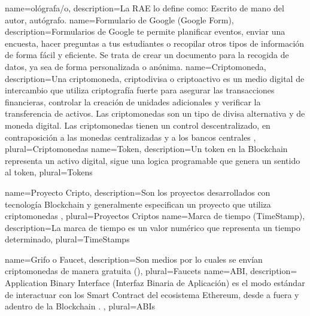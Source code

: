
{
name=ológrafa/o,
description={La RAE lo define como: Escrito de mano del autor, autógrafo. }
}
{
name=Formulario de Google  (Google Form),
description={Formularios de Google te permite planificar eventos, 
enviar 
una encuesta, hacer preguntas a tus estudiantes o recopilar otros 
tipos de información de forma fácil y eficiente. Se trata de crear un documento para la recogida de 
datos, ya sea de forma personalizada o anónima.}
}
{
name=Criptomoneda,
description={Una criptomoneda, criptodivisa o criptoactivo es un medio
digital de intercambio que utiliza criptografía fuerte para asegurar las
transacciones financieras, controlar la creación de unidades adicionales
y verificar la transferencia de activos. Las criptomonedas son un tipo
de divisa alternativa y de moneda digital. Las criptomonedas tienen un
control descentralizado, en contraposición a las monedas centralizadas y
a los bancos centrales \cite[]{brys_cadena_2019}},
plural={Criptomonedas}
}
{
name=Token,
description={Un token en la  Blockchain  representa un activo digital, sigue una logica programable que 
genera un sentido al token},
plural={Tokens}
}

{
name=Proyecto Cripto,
description={Son los proyectos desarrollados con tecnología  Blockchain y generalmente especifican un proyecto que utiliza criptomonedas },
plural={Proyectos Criptos}
}
{
name=Marca de tiempo (TimeStamp),
description={La marca de tiempo es un valor numérico que representa un tiempo determinado},
plural={TimeStamps}
}

{
name=Grifo o Faucet,
description={Son medios por lo cuales se envían criptomonedas de manera gratuita (\cite[]{dannen_introducing_2017})},
plural={Faucets}
}
{
name=ABI,
description={ Application Binary Interface (Interfaz Binaria de Aplicación) es el modo estándar de interactuar con los Smart Contract del 
ecosistema Ethereum, desde a fuera y adentro de la Blockchain \cite[]{ethereum_especificacion_nodate}.   },
plural={ABIs}
}









